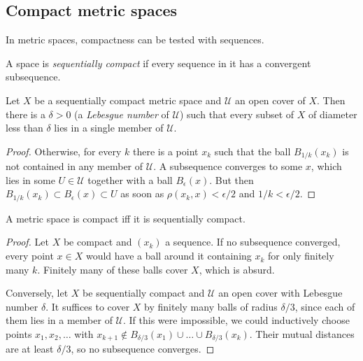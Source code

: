 \subsection{Compact metric spaces}

In metric spaces, compactness can be tested with sequences.

\begin{defn}
    A space is \emph{sequentially compact} if every sequence in it has a convergent subsequence.
\end{defn}

\begin{lem}\label{Lebesque lemma}
    Let $X$ be a sequentially compact metric space and $\mathscr{U}$ an open cover of $X$. Then there is a $\delta>0$ (a \emph{Lebesgue number} of $\mathscr{U}$) such that every subset of $X$ of diameter less than $\delta$ lies in a single member of $\mathscr{U}$.
\end{lem}
\begin{proof}
    Otherwise, for every $k$ there is a point $x_k$ such that the ball $B_{1/k}(x_k)$ is not contained in any member of $\mathscr{U}$. A subsequence converges to some $x$, which lies in some $U\in\mathscr{U}$ together with a ball $B_\epsilon(x)$. But then $B_{1/k}(x_k)\subset B_\epsilon(x)\subset U$ as soon as $\rho(x_k,x)<\epsilon/2$ and $1/k<\epsilon/2$.
\end{proof}

\begin{thm}\label{thm compact metric}
    A metric space is compact iff it is sequentially compact.
\end{thm}
\begin{proof}
    Let $X$ be compact and $(x_k)$ a sequence. If no subsequence converged, every point $x\in X$ would have a ball around it containing $x_k$ for only finitely many $k$. Finitely many of these balls cover $X$, which is absurd.

    Conversely, let $X$ be sequentially compact and $\mathscr{U}$ an open cover with Lebesgue number $\delta$. It suffices to cover $X$ by finitely many balls of radius $\delta/3$, since each of them lies in a member of $\mathscr{U}$. If this were impossible, we could inductively choose points $x_1,x_2,\ldots$ with $x_{k+1}\notin B_{\delta/3}(x_1)\cup\ldots\cup B_{\delta/3}(x_k)$. Their mutual distances are at least $\delta/3$, so no subsequence converges.
\end{proof}

